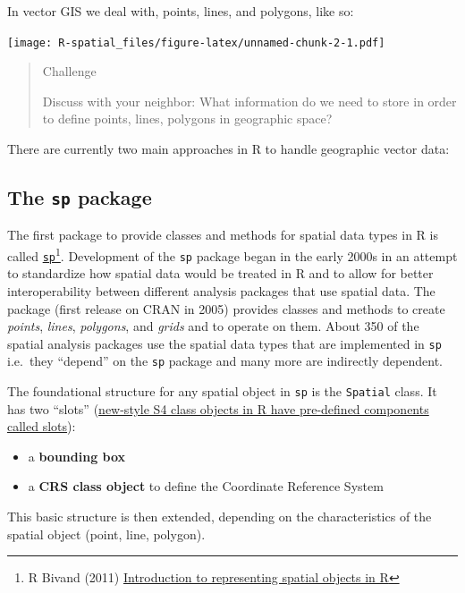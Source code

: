 \documentclass[]{book}
\let\rmarkdownfootnote\footnote%
\def\footnote{\protect\rmarkdownfootnote}
\theoremstyle{definition}
\theoremstyle{definition}
\theoremstyle{definition}
\theoremstyle{remark}
\begin{document}
In vector GIS we deal with, points, lines, and polygons, like so:

\texttt{[image: R-spatial\_files/figure-latex/unnamed-chunk-2-1.pdf]}

\begin{quote}
Challenge

Discuss with your neighbor: What information do we need to store in
order to define points, lines, polygons in geographic space?
\end{quote}

There are currently two main approaches in R to handle geographic vector
data:

\subsection{\texorpdfstring{The \texttt{sp}
package}{The sp package}}\label{the-sp-package}

The first package to provide classes and methods for spatial data types
in R is called
\href{https://cran.r-project.org/package=sp}{\texttt{sp}}\footnote{R
  Bivand (2011)
  \href{http://geostat-course.org/system/files/monday_slides.pdf}{Introduction
  to representing spatial objects in R}}. Development of the \texttt{sp}
package began in the early 2000s in an attempt to standardize how
spatial data would be treated in R and to allow for better
interoperability between different analysis packages that use spatial
data. The package (first release on CRAN in 2005) provides classes and
methods to create \emph{points}, \emph{lines}, \emph{polygons}, and
\emph{grids} and to operate on them. About 350 of the spatial analysis
packages use the spatial data types that are implemented in \texttt{sp}
i.e.~they ``depend'' on the \texttt{sp} package and many more are
indirectly dependent.

The foundational structure for any spatial object in \texttt{sp} is the
\texttt{Spatial} class. It has two ``slots''
(\href{http://stackoverflow.com/a/4714080}{new-style S4 class objects in
R have pre-defined components called slots}):

\begin{itemize}
\item
  a \textbf{bounding box}
\item
  a \textbf{CRS class object} to define the Coordinate Reference System
\end{itemize}

This basic structure is then extended, depending on the characteristics
of the spatial object (point, line, polygon).
\end{document}
